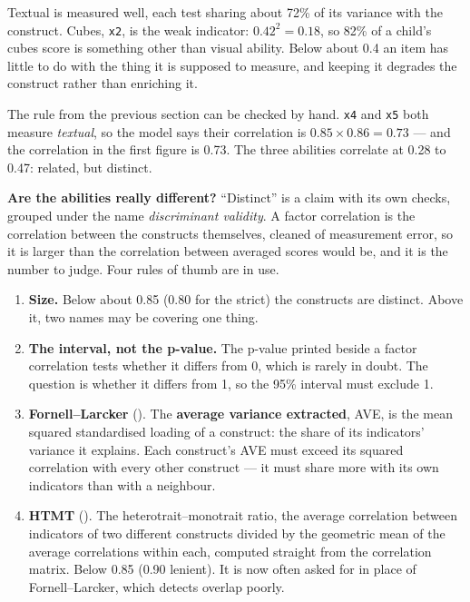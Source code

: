 \documentclass[
  letterpaper,
  10pt,
  twoside,
  openright,
  numbers=noenddot,
  chapterprefix=true]{scrbook}
\providecommand{\tightlist}{%
  \setlength{\itemsep}{0pt}\setlength{\parskip}{0pt}}
\begin{document}
Textual is measured well, each test sharing about 72\% of its variance
with the construct. Cubes, \texttt{x2}, is the weak indicator:
\(0.42^2 = 0.18\), so 82\% of a child's cubes score is something other
than visual ability. Below about 0.4 an item has little to do with the
thing it is supposed to measure, and keeping it degrades the construct
rather than enriching it.

The rule from the previous section can be checked by hand. \texttt{x4}
and \texttt{x5} both measure \emph{textual}, so the model says their
correlation is \(0.85 \times 0.86 = 0.73\) --- and the correlation in
the first figure is 0.73. The three abilities correlate at 0.28 to 0.47:
related, but distinct.

\textbf{Are the abilities really different?} ``Distinct'' is a claim
with its own checks, grouped under the name \emph{discriminant
validity}. A factor correlation is the correlation between the
constructs themselves, cleaned of measurement error, so it is larger
than the correlation between averaged scores would be, and it is the
number to judge. Four rules of thumb are in use.

\begin{enumerate}
\def\labelenumi{\arabic{enumi}.}
\tightlist
\item
  \textbf{Size.} Below about 0.85 (0.80 for the strict) the constructs
  are distinct. Above it, two names may be covering one thing.
\item
  \textbf{The interval, not the p-value.} The p-value printed beside a
  factor correlation tests whether it differs from 0, which is rarely in
  doubt. The question is whether it differs from 1, so the 95\% interval
  must exclude 1.
\item
  \textbf{Fornell--Larcker} (). The \textbf{average variance extracted}, AVE, is the
  mean squared standardised loading of a construct: the share of its
  indicators' variance it explains. Each construct's AVE must exceed its
  squared correlation with every other construct --- it must share more
  with its own indicators than with a neighbour.
\item
  \textbf{HTMT} (). The heterotrait--monotrait ratio, the average
  correlation between indicators of two different constructs divided by
  the geometric mean of the average correlations within each, computed
  straight from the correlation matrix. Below 0.85 (0.90 lenient). It is
  now often asked for in place of Fornell--Larcker, which detects
  overlap poorly.
\end{enumerate}
\end{document}
